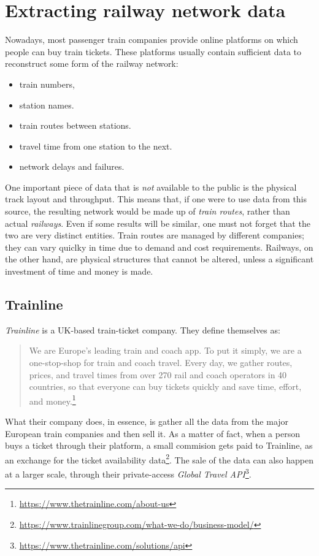 \section{Extracting railway network data}
Nowadays, most passenger train companies provide online platforms on which people can buy train tickets. These platforms usually contain sufficient data to reconstruct some form of the railway network:
\begin{itemize}
    \item train numbers,
    \item station names.
    \item train routes between stations.
    \item travel time from one station to the next.
    \item network delays and failures.
\end{itemize}

One important piece of data that is \emph{not} available to the public is the physical track layout and throughput.
This means that, if one were to use data from this source, the resulting network would be made up of \emph{train routes}, rather than actual \emph{railways}. Even if some results will be similar, one must not forget that the two are very distinct entities.
Train routes are managed by different companies; they can vary quiclky in time due to demand and cost requirements. Railways, on the other hand, are physical structures that cannot be altered, unless a significant investment of time and money is made.

\subsection{Trainline}
\emph{Trainline} is a UK-based train-ticket company. They define themselves as: \blockquote{We are Europe’s leading train and coach app. To put it simply, we are a one-stop-shop for train and coach travel. Every day, we gather routes, prices, and travel times from over 270 rail and coach operators in 40 countries, so that everyone can buy tickets quickly and save time, effort, and money.\footnote{\url{https://www.thetrainline.com/about-us}}}
What their company does, in essence, is gather all the data from the major European train companies and then sell it. 
As a matter of fact, when a person buys a ticket through their platform, a small commision gets paid to Trainline, as an exchange for the ticket availability data\footnote{\url{https://www.trainlinegroup.com/what-we-do/business-model/}}.
The sale of the data can also happen at a larger scale, through their private-access \emph{Global Travel API}\footnote{\url{https://www.thetrainline.com/solutions/api}}. 

